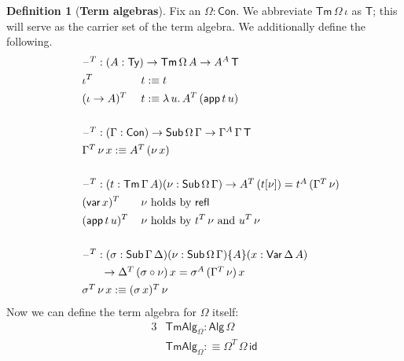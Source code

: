 \documentclass[12pt,a4paper,twoside,openany]{book}
\theoremstyle{remark}
\theoremstyle{definition}
\newtheorem{mydefinition}{Definition}
\newcommand{\ms}[1]{\mathsf{#1}}
\newcommand{\refl}{\mathsf{refl}}
\newcommand{\id}{\mathsf{id}}
\newcommand{\Con}{\mathsf{Con}}
\newcommand{\Sub}{\mathsf{Sub}}
\newcommand{\Tm}{\mathsf{Tm}}
\newcommand{\Ty}{\mathsf{Ty}}
\newcommand{\blank}{\mathord{\hspace{1pt}\text{--}\hspace{1pt}}}
\newcommand{\Var}{\ms{Var}}
\newcommand{\var}{\ms{var}}
\newcommand{\app}{\ms{app}}
\newcommand{\Alg}{\ms{Alg}}
\newcommand{\TmAlg}{\ms{TmAlg}}
\newcommand{\defn}{:\equiv}
\begin{document}
\begin{mydefinition}[\textbf{Term algebras}]
Fix an $\Omega : \Con$. We abbreviate $\Tm\,\Omega\,\iota$ as $\ms{T}$; this will serve
as the carrier set of the term algebra. We additionally define the following.
\begin{alignat*}{3}
  & \hspace{-5em}\rlap{$\blank^T : (A : \Ty) \to \Tm\,\Omega\,A \to A^A\,\ms{T}$} \\
  & \hspace{-5em}\iota^T\,&&t \defn t \\
  & \hspace{-5em}(\iota\to A)^T\,&&t \defn \lambda\,u.\,A^T\,(\app\,t\,u)\\
  & \hspace{-5em}&& \\
  & \hspace{-5em}\rlap{$\blank^T : (\Gamma : \Con) \to \Sub\,\Omega\,\Gamma \to \Gamma^A\,\Gamma\,\ms{T}$}\\
  & \hspace{-5em}\rlap{$\Gamma^T\,\nu\,x \defn A^T\,(\nu\,x)$}\\
  & \hspace{-5em}&& \\
  & \hspace{-5em}\rlap{$\blank^T : (t : \Tm\,\Gamma\,A)(\nu : \Sub\,\Omega\,\Gamma) \to A^T\,(t[\nu]) = t^A\,(\Gamma^T\,\nu)$}\\
  & \hspace{-5em}(\var\,x)^T\,   &&\nu    \text{   holds by   } \refl\\
  & \hspace{-5em}(\app\,t\,u)^T\,&&\nu \text {   holds by   } t^T\,\nu \text{   and   } u^T\,\nu\\
  & \hspace{-5em}&& \\
  & \hspace{-5em}\rlap{$\blank^T : (\sigma : \Sub\,\Gamma\,\Delta)(\nu : \Sub\,\Omega\,\Gamma)\{A\}(x : \Var\,\Delta\,A)$}\\
  & \hspace{-3em}\rlap{$\to \Delta^T\,(\sigma \circ \nu)\,x = \sigma^A\,(\Gamma^T\,\nu)\,x$}\\
  & \hspace{-5em}\rlap{$ \sigma^T\,\nu\,x \defn (\sigma\,x)^T\,\nu$}
\end{alignat*}
Now we can define the term algebra for $\Omega$ itself:
\begin{alignat*}{3}
  & \TmAlg_{\Omega} : \Alg\,\Omega \\
  & \TmAlg_{\Omega} \defn \Omega^T\,\Omega\,\id
\end{alignat*}
\end{mydefinition}
\endgroup
\end{document}
